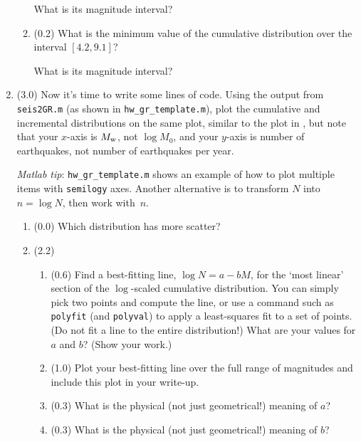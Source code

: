\documentclass[11pt,titlepage,fleqn]{article}
\begin{document}
\begin{enumerate}
\begin{enumerate}
What is its magnitude interval?

\item (0.2) What is the minimum value of the cumulative distribution over the interval $[4.2,9.1]$? 

What is its magnitude interval?

\end{enumerate}


\item (3.0) Now it's time to write some lines of code. Using the output from \verb+seis2GR.m+ (as shown in \verb+hw_gr_template.m+), plot the cumulative and incremental distributions on the same plot, similar to the plot in \citet[][Figure~4.7-2]{SteinWysession}, but note that your $x$-axis is $M_{\rm w}$, not $\log M_0$, and your $y$-axis is number of earthquakes, not number of earthquakes per year.

{\em Matlab tip}: \verb+hw_gr_template.m+ shows an example of how to plot multiple items with \verb+semilogy+ axes. Another alternative is to transform $N$ into $n = \log N$, then work with~$n$.

\begin{enumerate}
\item (0.0) Which distribution has more scatter?

\item (2.2)

\begin{enumerate}
\item (0.6) Find a best-fitting line, $\log N = a - b M$, for the `most linear' section of the $\log$-scaled cumulative distribution. You can simply pick two points and compute the line, or use a command such as \verb+polyfit+ (and \verb+polyval+) to apply a least-squares fit to a set of points. (Do not fit a line to the entire distribution!) What are your values for $a$ and $b$? (Show your work.)

\item (1.0) Plot your best-fitting line over the full range of magnitudes and include this plot in your write-up. 

\item (0.3) What is the physical (not just geometrical!) meaning of $a$?

\item (0.3) What is the physical (not just geometrical!) meaning of $b$?

\end{enumerate}


\end{enumerate}
\end{enumerate}
\end{document}
